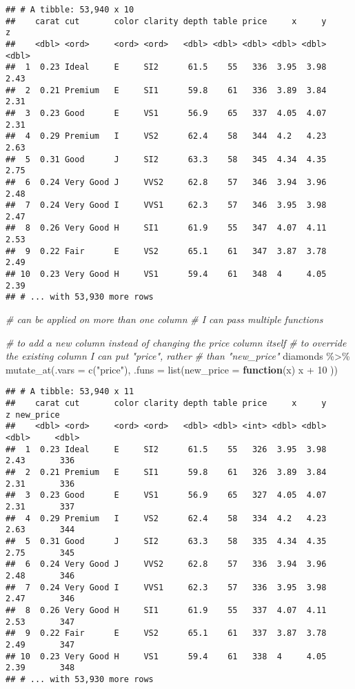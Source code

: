\documentclass[
]{article}
\newenvironment{Shaded}{\begin{snugshade}}{\end{snugshade}}
\newcommand{\AttributeTok}[1]{\textcolor[rgb]{0.77,0.63,0.00}{#1}}
\newcommand{\CommentTok}[1]{\textcolor[rgb]{0.56,0.35,0.01}{\textit{#1}}}
\newcommand{\ControlFlowTok}[1]{\textcolor[rgb]{0.13,0.29,0.53}{\textbf{#1}}}
\newcommand{\DecValTok}[1]{\textcolor[rgb]{0.00,0.00,0.81}{#1}}
\newcommand{\FunctionTok}[1]{\textcolor[rgb]{0.00,0.00,0.00}{#1}}
\newcommand{\NormalTok}[1]{#1}
\newcommand{\SpecialCharTok}[1]{\textcolor[rgb]{0.00,0.00,0.00}{#1}}
\newcommand{\StringTok}[1]{\textcolor[rgb]{0.31,0.60,0.02}{#1}}
\begin{document}
\begin{verbatim}
## # A tibble: 53,940 x 10
##    carat cut       color clarity depth table price     x     y     z
##    <dbl> <ord>     <ord> <ord>   <dbl> <dbl> <dbl> <dbl> <dbl> <dbl>
##  1  0.23 Ideal     E     SI2      61.5    55   336  3.95  3.98  2.43
##  2  0.21 Premium   E     SI1      59.8    61   336  3.89  3.84  2.31
##  3  0.23 Good      E     VS1      56.9    65   337  4.05  4.07  2.31
##  4  0.29 Premium   I     VS2      62.4    58   344  4.2   4.23  2.63
##  5  0.31 Good      J     SI2      63.3    58   345  4.34  4.35  2.75
##  6  0.24 Very Good J     VVS2     62.8    57   346  3.94  3.96  2.48
##  7  0.24 Very Good I     VVS1     62.3    57   346  3.95  3.98  2.47
##  8  0.26 Very Good H     SI1      61.9    55   347  4.07  4.11  2.53
##  9  0.22 Fair      E     VS2      65.1    61   347  3.87  3.78  2.49
## 10  0.23 Very Good H     VS1      59.4    61   348  4     4.05  2.39
## # ... with 53,930 more rows
\end{verbatim}

\begin{Shaded}
\begin{Highlighting}[]
\CommentTok{\# can be applied on more than one column}
\CommentTok{\# I can pass multiple functions}

\CommentTok{\# to add a new column instead of changing the price column itself}
\CommentTok{\#\textquotesingle{} to override the existing column I can put "price", rather}
\CommentTok{\#\textquotesingle{} than "new\_price"}
\NormalTok{diamonds }\SpecialCharTok{\%\textgreater{}\%}
  \FunctionTok{mutate\_at}\NormalTok{(}\AttributeTok{.vars =} \FunctionTok{c}\NormalTok{(}\StringTok{"price"}\NormalTok{),}
            \AttributeTok{.funs =} \FunctionTok{list}\NormalTok{(}\AttributeTok{new\_price =} \ControlFlowTok{function}\NormalTok{(x) x }\SpecialCharTok{+} \DecValTok{10}\NormalTok{ ))}
\end{Highlighting}
\end{Shaded}

\begin{verbatim}
## # A tibble: 53,940 x 11
##    carat cut       color clarity depth table price     x     y     z new_price
##    <dbl> <ord>     <ord> <ord>   <dbl> <dbl> <int> <dbl> <dbl> <dbl>     <dbl>
##  1  0.23 Ideal     E     SI2      61.5    55   326  3.95  3.98  2.43       336
##  2  0.21 Premium   E     SI1      59.8    61   326  3.89  3.84  2.31       336
##  3  0.23 Good      E     VS1      56.9    65   327  4.05  4.07  2.31       337
##  4  0.29 Premium   I     VS2      62.4    58   334  4.2   4.23  2.63       344
##  5  0.31 Good      J     SI2      63.3    58   335  4.34  4.35  2.75       345
##  6  0.24 Very Good J     VVS2     62.8    57   336  3.94  3.96  2.48       346
##  7  0.24 Very Good I     VVS1     62.3    57   336  3.95  3.98  2.47       346
##  8  0.26 Very Good H     SI1      61.9    55   337  4.07  4.11  2.53       347
##  9  0.22 Fair      E     VS2      65.1    61   337  3.87  3.78  2.49       347
## 10  0.23 Very Good H     VS1      59.4    61   338  4     4.05  2.39       348
## # ... with 53,930 more rows
\end{verbatim}
\end{document}
